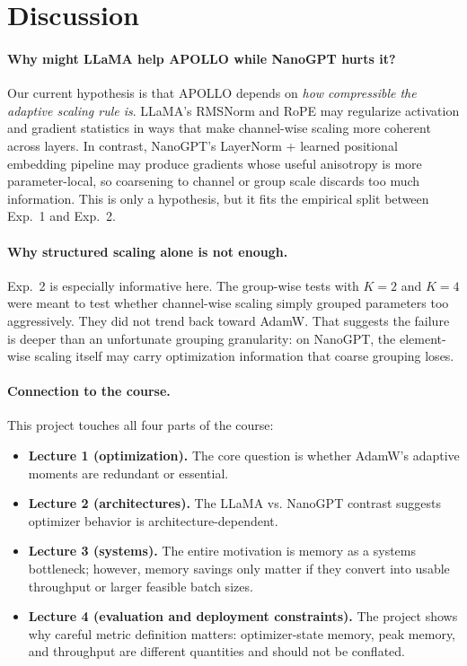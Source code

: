 \documentclass[10pt]{article}
\begin{document}
\section{Discussion}
\paragraph{Why might LLaMA help APOLLO while NanoGPT hurts it?}
Our current hypothesis is that APOLLO depends on \emph{how compressible the adaptive scaling rule is}. LLaMA's RMSNorm and RoPE may regularize activation and gradient statistics in ways that make channel-wise scaling more coherent across layers. In contrast, NanoGPT's LayerNorm + learned positional embedding pipeline may produce gradients whose useful anisotropy is more parameter-local, so coarsening to channel or group scale discards too much information. This is only a hypothesis, but it fits the empirical split between Exp.~1 and Exp.~2.

\paragraph{Why structured scaling alone is not enough.}
Exp.~2 is especially informative here. The group-wise tests with $K=2$ and $K=4$ were meant to test whether channel-wise scaling simply grouped parameters too aggressively. They did not trend back toward AdamW. That suggests the failure is deeper than an unfortunate grouping granularity: on NanoGPT, the element-wise scaling itself may carry optimization information that coarse grouping loses.

\paragraph{Connection to the course.}
This project touches all four parts of the course:
\begin{itemize}
  \item \textbf{Lecture 1 (optimization).} The core question is whether AdamW's adaptive moments are redundant or essential.
  \item \textbf{Lecture 2 (architectures).} The LLaMA vs. NanoGPT contrast suggests optimizer behavior is architecture-dependent.
  \item \textbf{Lecture 3 (systems).} The entire motivation is memory as a systems bottleneck; however, memory savings only matter if they convert into usable throughput or larger feasible batch sizes.
  \item \textbf{Lecture 4 (evaluation and deployment constraints).} The project shows why careful metric definition matters: optimizer-state memory, peak memory, and throughput are different quantities and should not be conflated.
\end{itemize}
\end{document}
